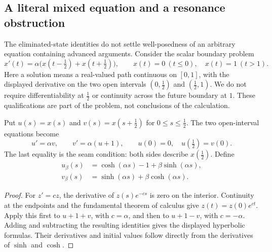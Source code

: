 \subsection{A literal mixed equation and a resonance obstruction}
\label{sec:mixed-boundary}

The eliminated-state identities do not settle well-posedness of an
arbitrary equation containing advanced arguments. Consider the scalar
boundary problem
\begin{equation}\label{eq:mixed-boundary}
 x'(t)=\alpha\bigl(x(t-\tfrac12)+x(t+\tfrac12)\bigr),\qquad
 x(t)=0\ (t\le0),\quad x(t)=1\ (t>1).
\end{equation}
Here a solution means a real-valued path continuous on $[0,1]$, with
the displayed derivative on the two open intervals $(0,\tfrac12)$ and
$(\tfrac12,1)$. We do not require differentiability at $\tfrac12$ or
continuity across the future boundary at $1$. These qualifications are
part of the problem, not conclusions of the calculation.

Put $u(s)=x(s)$ and $v(s)=x(s+\tfrac12)$ for $0\le s\le\tfrac12$.
The two open-interval equations become
\[
 u'=\alpha v,\qquad v'=\alpha(u+1),\qquad
 u(0)=0,\quad u(\tfrac12)=v(0).
\]
The last equality is the seam condition: both sides describe
$x(\tfrac12)$. Define
\begin{align*}
 u_\beta(s)&=\cosh(\alpha s)-1+\beta\sinh(\alpha s),\\
 v_\beta(s)&=\sinh(\alpha s)+\beta\cosh(\alpha s).
\end{align*}

\begin{proof}
For $z'=cz$, the derivative of $z(s)e^{-cs}$ is zero on the
interior. Continuity at the endpoints and the fundamental theorem of
calculus give $z(t)=z(0)e^{ct}$. Apply this first to $u+1+v$, with
$c=\alpha$, and then to $u+1-v$, with $c=-\alpha$. Adding and
subtracting the resulting identities gives the displayed hyperbolic
formulas. Their derivatives and initial values follow directly from
the derivatives of $\sinh$ and $\cosh$.
\end{proof}

